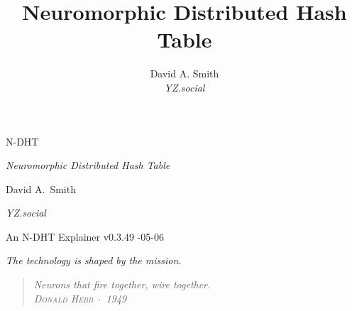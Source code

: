 \documentclass[nobib]{tufte-handout}
\title{Neuromorphic Distributed Hash Table}
\author[David A. Smith]{David A. Smith \\[0.3em] \emph{\small YZ.social}}
\date{}
\begin{document}

\thispagestyle{empty}
\null\vfill
\begin{center}
{\fontsize{48}{52}\selectfont \textsc{N-DHT}\par}
\vspace{0.6em}
{\Large\itshape Neuromorphic Distributed Hash Table\par}
\vspace{4em}
{\large David A.~Smith\par}
{\itshape\small YZ.social\par}
\vspace{2em}
{\small An N-DHT Explainer \quad v0.3.49 -05-06\par}
\end{center}
\vfill
\null
\newpage

\thispagestyle{empty}
\null\vfill
\begin{flushright}
\itshape The technology is shaped by the mission.\par
\end{flushright}
\vfill
\null\newpage

\pagestyle{ndhtplain}
\thispagestyle{ndhtplain}
\setcounter{page}{1}

\begin{quote}
  \itshape Neurons that fire together, wire together.\\[0.3em]
  \normalfont\textsc{\footnotesize Donald Hebb} \,$\cdot$\, 1949
\end{quote}
\end{document}
